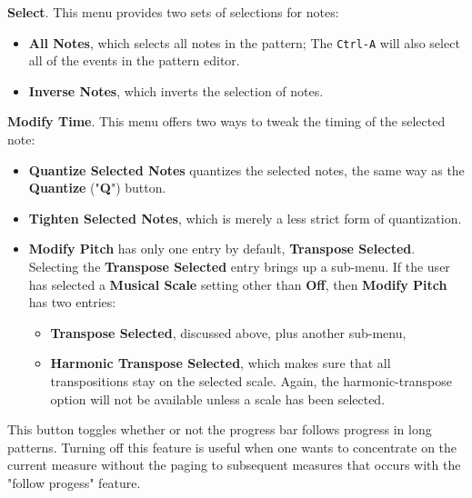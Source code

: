    \begin{enumber}
      \item \textbf{Select}.  This menu
      provides two sets of selections for notes:
      \begin{itemize}
         \item \textbf{All Notes}, which selects all notes in the pattern;
            The  \texttt{Ctrl-A} will also select
            all of the events in the pattern editor.
         \item \textbf{Inverse Notes}, which inverts the selection of notes.
      \end{itemize}
      \item \textbf{Modify Time}. This menu
      offers two ways to tweak the timing of the selected note:
      \begin{itemize}
         \item \textbf{Quantize Selected Notes}
            quantizes the selected notes, the same way as the
            \textbf{Quantize} ("\textbf{Q}") button.
         \item \textbf{Tighten Selected Notes},
            which is merely a less strict form of quantization.
         \item \textbf{Modify Pitch} has only one entry by default,
            \textbf{Transpose Selected}.
            Selecting the \textbf{Transpose Selected} entry brings up a sub-menu.
            If the user has selected a
            \textbf{Musical Scale} setting other than \textbf{Off},
            then \textbf{Modify Pitch} has two entries:
            \begin{itemize}
               \item \textbf{Transpose Selected}, discussed above, plus
                  another sub-menu,
               \item \textbf{Harmonic Transpose Selected}, which makes sure
                  that all transpositions stay on the selected scale.
                  Again, the harmonic-transpose option will not be
                  available unless a scale has been selected.
            \end{itemize}
      \end{itemize}
   \end{enumber}

   This button toggles whether or not the progress bar follows
   progress in long patterns.  Turning off this feature is useful when
   one wants to concentrate on the current measure without the paging to
   subsequent measures that occurs with the "follow progess" feature.

